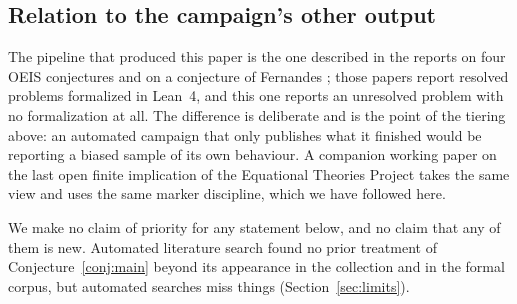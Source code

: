 \documentclass[11pt]{article}
\theoremstyle{plain}
\theoremstyle{definition}
\theoremstyle{remark}
\numberwithin{equation}{section}
\begin{document}
\subsection{Relation to the campaign's other output}\label{sec:relwork}

The pipeline that produced this paper is the one described in the reports on four OEIS
conjectures \cite{batch1} and on a conjecture of Fernandes \cite{fernandespaper}; those
papers report resolved problems formalized in Lean~4, and this one reports an unresolved
problem with no formalization at all. The difference is deliberate and is the point of the
tiering above: an automated campaign that only publishes what it finished would be
reporting a biased sample of its own behaviour. A companion working paper on the last open
finite implication of the Equational Theories Project \cite{etp677} takes the same view and
uses the same marker discipline, which we have followed here.

We make no claim of priority for any statement below, and no claim that any of them is new.
Automated literature search found no prior treatment of Conjecture~\ref{conj:main} beyond
its appearance in the collection and in the formal corpus, but automated searches miss
things (Section~\ref{sec:limits}).


\end{document}
